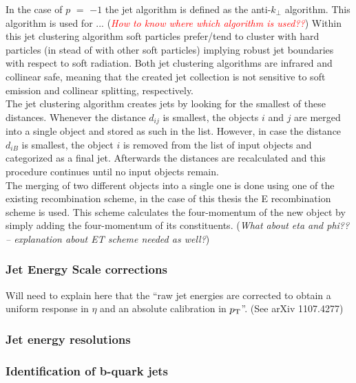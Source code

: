 In the case of $p$ $=$ $-1$ the jet algorithm is defined as the anti-$k_{\bot}$ algorithm. This algorithm is used for ... (\textit{\textcolor{red}{How to know where which algorithm is used??}})
Within this jet clustering algorithm soft particles prefer/tend to cluster with hard particles (in stead of with other soft particles) implying robust jet boundaries with respect to soft radiation. Both jet clustering algorithms are infrared and collinear safe, meaning that the created jet collection is not sensitive to soft emission and collinear splitting, respectively.
\\

The jet clustering algorithm creates jets by looking for the smallest of these distances. Whenever the distance $d_{ij}$ is smallest, the objects $i$ and $j$ are merged into a single object and stored as such in the list. However, in case the distance $d_{iB}$ is smallest, the object $i$ is removed from the list of input objects and categorized as a final jet. Afterwards the distances are recalculated and this procedure continues until no input objects remain.
\\
The merging of two different objects into a single one is done using one of the existing recombination scheme, in the case of this thesis the E recombination scheme is used. This scheme calculates the four-momentum of the new object by simply adding the four-momentum of its constituents. (\textit{What about eta and phi?? -- explanation about ET scheme needed as well?})

\subsubsection*{Jet Energy Scale corrections}
Will need to explain here that the ``raw jet energies are corrected to obtain a uniform response in $\eta$ and an absolute calibration in $p_{\rm T}$''. (See arXiv 1107.4277)

\subsubsection*{Jet energy resolutions}

\subsubsection*{Identification of b-quark jets}

